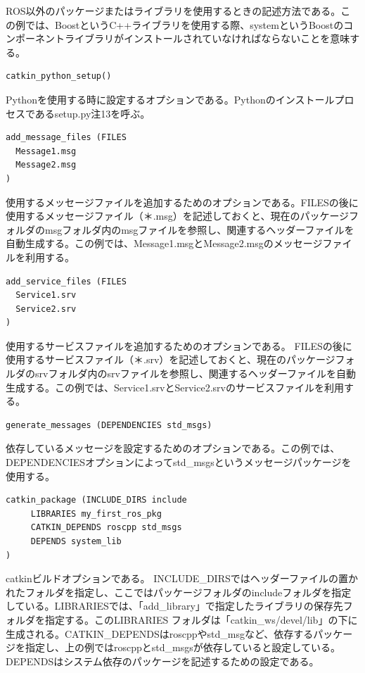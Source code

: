 ROS以外のパッケージまたはライブラリを使用するときの記述方法である。この例では、BoostというC++ライブラリを使用する際、systemというBoostのコンポーネントライブラリがインストールされていなければならないことを意味する。

\begin{lstlisting}[language=make]
catkin_python_setup()
\end{lstlisting}

Pythonを使用する時に設定するオプションである。Pythonのインストールプロセスであるsetup.py注13を呼ぶ。

\begin{lstlisting}[language=make]
add_message_files (FILES
  Message1.msg
  Message2.msg
)
\end{lstlisting}

使用するメッセージファイルを追加するためのオプションである。FILESの後に使用するメッセージファイル（＊.msg）を記述しておくと、現在のパッケージフォルダのmsgフォルダ内のmsgファイルを参照し、関連するヘッダーファイルを自動生成する。この例では、Message1.msgとMessage2.msgのメッセージファイルを利用する。

\begin{lstlisting}[language=make]
add_service_files (FILES
  Service1.srv
  Service2.srv
)
\end{lstlisting}

使用するサービスファイルを追加するためのオプションである。 FILESの後に使用するサービスファイル（＊.srv）を記述しておくと、現在のパッケージフォルダのsrvフォルダ内のsrvファイルを参照し、関連するヘッダーファイルを自動生成する。この例では、Service1.srvとService2.srvのサービスファイルを利用する。

\begin{lstlisting}[language=make]
generate_messages (DEPENDENCIES std_msgs)
\end{lstlisting}

依存しているメッセージを設定するためのオプションである。この例では、DEPENDENCIESオプションによってstd\_msgsというメッセージパッケージを使用する。

\begin{lstlisting}[language=make]
catkin_package (INCLUDE_DIRS include
     LIBRARIES my_first_ros_pkg
     CATKIN_DEPENDS roscpp std_msgs
     DEPENDS system_lib
)
\end{lstlisting}

catkinビルドオプションである。 INCLUDE\_DIRSではヘッダーファイルの置かれたフォルダを指定し、ここではパッケージフォルダのincludeフォルダを指定している。LIBRARIESでは、「add\_library」で指定したライブラリの保存先フォルダを指定する。このLIBRARIES フォルダは「catkin\_ws/devel/lib」の下に生成される。CATKIN\_DEPENDSはroscppやstd\_msgなど、依存するパッケージを指定し、上の例ではroscppとstd\_msgsが依存していると設定している。DEPENDSはシステム依存のパッケージを記述するための設定である。

